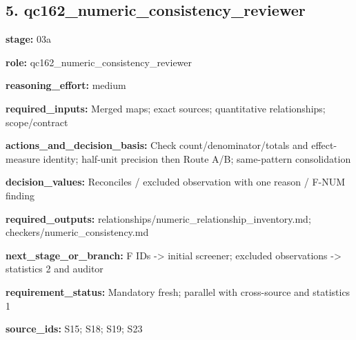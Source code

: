 \documentclass[10pt,a4paper]{article}
\begin{document}
\subsection*{5.\allowbreak{} qc162\_\allowbreak{}numeric\_\allowbreak{}consistency\_\allowbreak{}reviewer}
\textbf{stage:} 03a\par
\textbf{role:} qc162\_\allowbreak{}numeric\_\allowbreak{}consistency\_\allowbreak{}reviewer\par
\textbf{reasoning\_\allowbreak{}effort:} medium\par
\textbf{required\_\allowbreak{}inputs:} Merged maps; exact sources; quantitative relationships; scope/\allowbreak{}contract\par
\textbf{actions\_\allowbreak{}and\_\allowbreak{}decision\_\allowbreak{}basis:} Check count/\allowbreak{}denominator/\allowbreak{}totals and effect-\allowbreak{}measure identity; half-\allowbreak{}unit precision then Route A/\allowbreak{}B; same-\allowbreak{}pattern consolidation\par
\textbf{decision\_\allowbreak{}values:} Reconciles /\allowbreak{} excluded observation with one reason /\allowbreak{} F-\allowbreak{}NUM finding\par
\textbf{required\_\allowbreak{}outputs:} relationships/\allowbreak{}numeric\_\allowbreak{}relationship\_\allowbreak{}inventory.\allowbreak{}md; checkers/\allowbreak{}numeric\_\allowbreak{}consistency.\allowbreak{}md\par
\textbf{next\_\allowbreak{}stage\_\allowbreak{}or\_\allowbreak{}branch:} F IDs -\allowbreak{}> initial screener; excluded observations -\allowbreak{}> statistics 2 and auditor\par
\textbf{requirement\_\allowbreak{}status:} Mandatory fresh; parallel with cross-\allowbreak{}source and statistics 1\par
\textbf{source\_\allowbreak{}ids:} S15; S18; S19; S23\par
\end{document}

